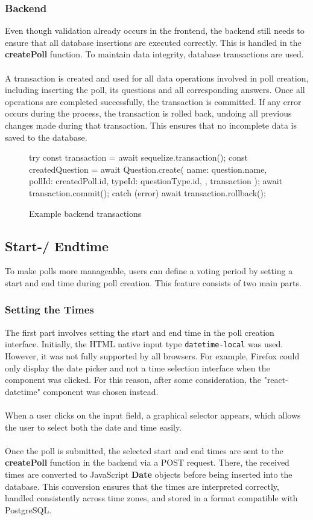 \documentclass[a4paper,12pt]{report}
\begin{document}
\subsubsection{Backend}
Even though validation already occurs in the frontend, the backend still needs to ensure that all database insertions are executed correctly. This is handled in the \textbf{createPoll} function. To maintain data integrity, database transactions are used.\\\\
A transaction is created and used for all data operations involved in poll creation, including inserting the poll, its questions and all corresponding answers. Once all operations are completed successfully, the transaction is committed. If any error occurs during the process, the transaction is rolled back, undoing all previous changes made during that transaction. This ensures that no incomplete data is saved to the database.
\begin{figure}[H]
	\begin{code}
	try {
		const transaction = await sequelize.transaction();
		const createdQuestion = await Question.create({
			name: question.name,
			pollId: createdPoll.id,
			typeId: questionType.id,
		}, { transaction });
		await transaction.commit();
	} catch (error) {
		await transaction.rollback();
	}
	\end{code}
	\caption{Example backend transactions}
	\label{fig:example-transaction}
\end{figure} 
\subsection{Start-/ Endtime}
To make polls more manageable, users can define a voting period by setting a start and end time during poll creation. This feature consists of two main parts.
\subsubsection{Setting the Times}
The first part involves setting the start and end time in the poll creation interface. Initially, the HTML native input type \texttt{datetime-local} was used. However, it was not fully supported by all browsers. For example, Firefox could only display the date picker and not a time selection interface when the component was clicked. For this reason, after some consideration, the "react-datetime" component was chosen instead.\\\\
When a user clicks on the input field, a graphical selector appears, which allows the user to select both the date and time easily.\\\\
Once the poll is submitted, the selected start and end times are sent to the \textbf{createPoll} function in the backend via a POST request. There, the received times are converted to JavaScript \textbf{Date} objects before being inserted into the database. This conversion ensures that the times are interpreted correctly, handled consistently across time zones, and stored in a format compatible with PostgreSQL.
\end{document}
